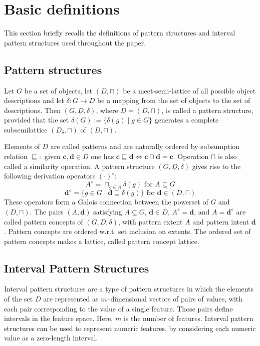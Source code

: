 \documentclass[a4paper,fleqn]{cas-sc}
\begin{document}
\section{Basic definitions}
This section briefly recalls the definitions of pattern structures and interval pattern structures used throughout the paper.

\subsection{Pattern structures}

Let $G$ be a set of objects, let $(D,\sqcap)$ be a meet-semi-lattice of all possible object descriptions and let $\delta: G\to D$ be a mapping from the set of objects to the set of descriptions. Then $(G,\underline{D},\delta)$, where $\underline{D}=(D,\sqcap)$, is called a pattern structure, provided that the set $\delta(G):= \{\delta(g)\mid g\in G\}$ generates a complete subsemilattice $(D_\delta,\sqcap)$ of $(D,\sqcap)$. 

Elements of $D$ are called patterns and are naturally ordered by subsumption relation $\sqsubseteq:$ given $\mathbf{c}, \mathbf{d} \in D$ one has $\mathbf{c}\sqsubseteq \mathbf{d} \Leftrightarrow \mathbf{c}\sqcap \mathbf{d} = \mathbf{c}$. Operation $\sqcap$ is also called a similarity operation. A pattern structure $(G, \underline{D}, \delta)$ gives rise to the following derivation operators $(\cdot)^\diamond$:
\begin{equation}
    A^\diamond = \sqcap_{g\in A} \delta(g) \text{ for } A\subseteq G
\end{equation}
\begin{equation}
    \mathbf{d}^\diamond=\{g\in G\mid \mathbf{d}\sqsubseteq\delta(g)\} \text{ for } \mathbf{d}\in(D,\sqcap)
\end{equation}
These operators form a Galois connection between the powerset of $G$ and $(D, \sqcap)$. The pairs $(A, \mathbf{d})$ satisfying $A \subseteq G$, $\mathbf{d} \in D$, $A^\diamond = \mathbf{d}$, and $A = \mathbf{d}^\diamond$ are called pattern concepts of $(G, D, \delta)$, with pattern extent $A$ and pattern intent $\mathbf{d}$.  Pattern concepts are ordered w.r.t. set inclusion on extents. The ordered set of pattern concepts makes a lattice, called pattern concept lattice.

\subsection{Interval Pattern Structures}
Interval pattern structures are a type of pattern structures in which the elements of the set $D$ are represented as $m$--dimensional vectors of pairs of values, with each pair corresponding to the value of a single feature. Those pairs define intervals in the feature space. Here, $m$ is the number of features. Interval pattern structures can be used to represent numeric features, by considering each numeric value as a zero-length interval.
\end{document}
